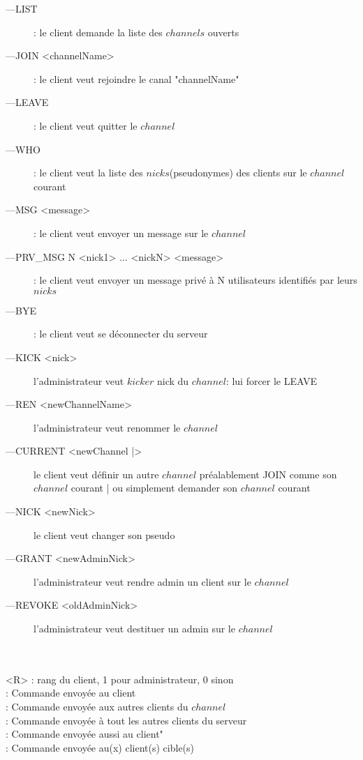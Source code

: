 \documentclass[12pt]{article}
\begin{document}
\begin{description}
    \item[---LIST]: le client demande la liste des $channels$ ouverts
    \item[---JOIN <channelName>]: le client veut rejoindre le canal "channelName" 
    \item[---LEAVE]: le client veut quitter le $channel$
    \item[---WHO] : le client veut la liste des $nicks$(pseudonymes) des clients
    sur le $channel$ courant
    \item[---MSG <message>]: le client veut envoyer un message sur le $channel$
    \item[---PRV\_MSG N <nick1> ... <nickN> <message>]: le client veut
         envoyer un message privé à N utilisateurs identifiés par leurs $nicks$
    \item[---BYE]: le client veut se déconnecter du serveur
    \item[---KICK <nick>]  l'administrateur veut $kicker$ nick
    du $channel$: lui forcer le LEAVE
    \item[---REN <newChannelName>]  l'administrateur veut renommer le $channel$
    \item[---CURRENT <newChannel |>]  le client veut définir un autre
    $channel$ préalablement JOIN comme son $channel$ courant | ou simplement
    demander son $channel$ courant
    \item[---NICK <newNick>]  le client veut changer son pseudo
    \item[---GRANT <newAdminNick>]  l'administrateur veut rendre admin
                                                un client sur le $channel$ 
    \item[---REVOKE <oldAdminNick>]  l'administrateur veut destituer 
                                            un admin sur le $channel$
    \\
\end{description}



\\

\\<R> :  rang du client, 1 pour administrateur, 0 sinon
\\ : Commande envoyée au client
\\ : Commande envoyée aux autres clients du $channel$
\\ : Commande envoyée à tout les autres clients du serveur
\\ : Commande envoyée aussi au client"
\\ : Commande envoyée au(x) client(s) cible(s)
\end{document}
